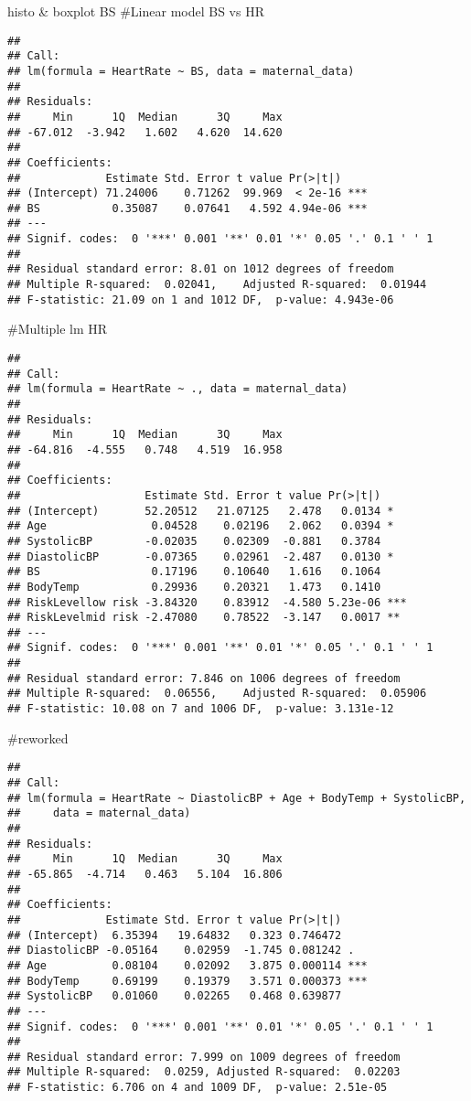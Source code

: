 \documentclass[
  ignorenonframetext,
]{beamer}
\begin{document}
\begin{frame}[fragile]{histo \& boxplot BS}
\#Linear model BS vs HR

\begin{verbatim}
## 
## Call:
## lm(formula = HeartRate ~ BS, data = maternal_data)
## 
## Residuals:
##     Min      1Q  Median      3Q     Max 
## -67.012  -3.942   1.602   4.620  14.620 
## 
## Coefficients:
##             Estimate Std. Error t value Pr(>|t|)    
## (Intercept) 71.24006    0.71262  99.969  < 2e-16 ***
## BS           0.35087    0.07641   4.592 4.94e-06 ***
## ---
## Signif. codes:  0 '***' 0.001 '**' 0.01 '*' 0.05 '.' 0.1 ' ' 1
## 
## Residual standard error: 8.01 on 1012 degrees of freedom
## Multiple R-squared:  0.02041,    Adjusted R-squared:  0.01944 
## F-statistic: 21.09 on 1 and 1012 DF,  p-value: 4.943e-06
\end{verbatim}

\#Multiple lm HR

\begin{verbatim}
## 
## Call:
## lm(formula = HeartRate ~ ., data = maternal_data)
## 
## Residuals:
##     Min      1Q  Median      3Q     Max 
## -64.816  -4.555   0.748   4.519  16.958 
## 
## Coefficients:
##                   Estimate Std. Error t value Pr(>|t|)    
## (Intercept)       52.20512   21.07125   2.478   0.0134 *  
## Age                0.04528    0.02196   2.062   0.0394 *  
## SystolicBP        -0.02035    0.02309  -0.881   0.3784    
## DiastolicBP       -0.07365    0.02961  -2.487   0.0130 *  
## BS                 0.17196    0.10640   1.616   0.1064    
## BodyTemp           0.29936    0.20321   1.473   0.1410    
## RiskLevellow risk -3.84320    0.83912  -4.580 5.23e-06 ***
## RiskLevelmid risk -2.47080    0.78522  -3.147   0.0017 ** 
## ---
## Signif. codes:  0 '***' 0.001 '**' 0.01 '*' 0.05 '.' 0.1 ' ' 1
## 
## Residual standard error: 7.846 on 1006 degrees of freedom
## Multiple R-squared:  0.06556,    Adjusted R-squared:  0.05906 
## F-statistic: 10.08 on 7 and 1006 DF,  p-value: 3.131e-12
\end{verbatim}

\#reworked

\begin{verbatim}
## 
## Call:
## lm(formula = HeartRate ~ DiastolicBP + Age + BodyTemp + SystolicBP, 
##     data = maternal_data)
## 
## Residuals:
##     Min      1Q  Median      3Q     Max 
## -65.865  -4.714   0.463   5.104  16.806 
## 
## Coefficients:
##             Estimate Std. Error t value Pr(>|t|)    
## (Intercept)  6.35394   19.64832   0.323 0.746472    
## DiastolicBP -0.05164    0.02959  -1.745 0.081242 .  
## Age          0.08104    0.02092   3.875 0.000114 ***
## BodyTemp     0.69199    0.19379   3.571 0.000373 ***
## SystolicBP   0.01060    0.02265   0.468 0.639877    
## ---
## Signif. codes:  0 '***' 0.001 '**' 0.01 '*' 0.05 '.' 0.1 ' ' 1
## 
## Residual standard error: 7.999 on 1009 degrees of freedom
## Multiple R-squared:  0.0259, Adjusted R-squared:  0.02203 
## F-statistic: 6.706 on 4 and 1009 DF,  p-value: 2.51e-05
\end{verbatim}


\end{frame}
\end{document}
